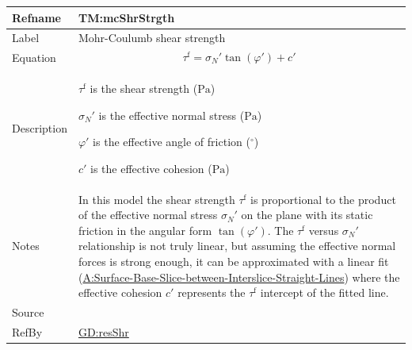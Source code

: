 \documentclass[12pt]{article}
\begin{document}
\medskip
\noindent
\begin{minipage}{\textwidth}
\begin{tabular}{>{\raggedright}p{}>{\raggedright\arraybackslash}p{}}
\toprule \textbf{Refname} & \textbf{TM:mcShrStrgth}
\label{TM:mcShrStrgth}
\\ \midrule
Label & Mohr-Coulumb shear strength
        
\\ \midrule
Equation & \begin{displaymath}
           {τ^{\text{f}}}={σ_{N}}' \tan\left(φ'\right)+c'
           \end{displaymath}
\\ \midrule
Description & \begin{symbDescription}
              \item{${τ^{\text{f}}}$ is the shear strength (${\text{Pa}}$)}
              \item{${σ_{N}}'$ is the effective normal stress (${\text{Pa}}$)}
              \item{$φ'$ is the effective angle of friction (${{}^{\circ}}$)}
              \item{$c'$ is the effective cohesion (${\text{Pa}}$)}
              \end{symbDescription}
\\ \midrule
Notes & In this model the shear strength ${τ^{\text{f}}}$ is proportional to the product of the effective normal stress ${σ_{N}}'$ on the plane with its static friction in the angular form $\tan\left(φ'\right)$. The ${τ^{\text{f}}}$ versus ${σ_{N}}'$ relationship is not truly linear, but assuming the effective normal forces is strong enough, it can be approximated with a linear fit (\hyperref[assumpSBSBISL]{A:Surface-Base-Slice-between-Interslice-Straight-Lines}) where the effective cohesion $c'$ represents the ${τ^{\text{f}}}$ intercept of the fitted line.
        
\\ \midrule
Source & \cite{fredlund1977}
         
\\ \midrule
RefBy & \hyperref[GD:resShr]{GD:resShr}
        
\\ \bottomrule
\end{tabular}
\end{minipage}
\end{document}
